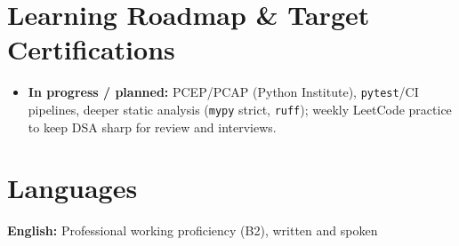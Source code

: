 \documentclass[10pt]{article}
\begin{document}
\section{Learning Roadmap \& Target Certifications}
\begin{itemize}
  \item \textbf{In progress / planned:} PCEP/PCAP (Python Institute), \texttt{pytest}/CI pipelines, deeper static analysis (\texttt{mypy} strict, \texttt{ruff}); weekly LeetCode practice to keep DSA sharp for review and interviews.
\end{itemize}

\section{Languages}
 \quad\textbullet\quad \textbf{English:} Professional working proficiency (B2), written and spoken
\end{document}
